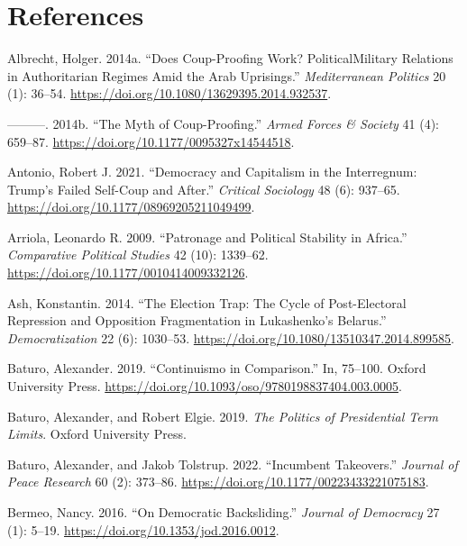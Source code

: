 \documentclass[
  12pt,
]{report}
\newlength{\cslhangindent}
\newenvironment{CSLReferences}[2] %
 {\begin{list}{}{%
  \setlength{\itemindent}{0pt}
  \setlength{\leftmargin}{0pt}
  \setlength{\parsep}{0pt}
  \ifodd #1
   \setlength{\leftmargin}{\cslhangindent}
   \setlength{\itemindent}{-1\cslhangindent}
  \fi
  \setlength{\itemsep}{#2\baselineskip}}}
 {\end{list}}
\begin{document}
\chapter*{References}\label{references}

\label{refs}
\begin{CSLReferences}{1}{0}
Albrecht, Holger. 2014a. {``Does Coup-Proofing Work?
Political{\textendash}Military Relations in Authoritarian Regimes Amid
the Arab Uprisings.''} \emph{Mediterranean Politics} 20 (1): 36--54.
\url{https://doi.org/10.1080/13629395.2014.932537}.

---------. 2014b. {``The Myth of Coup-Proofing.''} \emph{Armed Forces \&
Society} 41 (4): 659--87.
\url{https://doi.org/10.1177/0095327x14544518}.

Antonio, Robert J. 2021. {``Democracy and Capitalism in the Interregnum:
Trump{'}s Failed Self-Coup and After.''} \emph{Critical Sociology} 48
(6): 937--65. \url{https://doi.org/10.1177/08969205211049499}.

Arriola, Leonardo R. 2009. {``Patronage and Political Stability in
Africa.''} \emph{Comparative Political Studies} 42 (10): 1339--62.
\url{https://doi.org/10.1177/0010414009332126}.

Ash, Konstantin. 2014. {``The Election Trap: The Cycle of Post-Electoral
Repression and Opposition Fragmentation in Lukashenko's Belarus.''}
\emph{Democratization} 22 (6): 1030--53.
\url{https://doi.org/10.1080/13510347.2014.899585}.

Baturo, Alexander. 2019. {``Continuismo in Comparison.''} In, 75--100.
Oxford University Press.
\url{https://doi.org/10.1093/oso/9780198837404.003.0005}.

Baturo, Alexander, and Robert Elgie. 2019. \emph{The Politics of
Presidential Term Limits}. Oxford University Press.

Baturo, Alexander, and Jakob Tolstrup. 2022. {``Incumbent Takeovers.''}
\emph{Journal of Peace Research} 60 (2): 373--86.
\url{https://doi.org/10.1177/00223433221075183}.

Bermeo, Nancy. 2016. {``On Democratic Backsliding.''} \emph{Journal of
Democracy} 27 (1): 5--19. \url{https://doi.org/10.1353/jod.2016.0012}.


\end{CSLReferences}
\end{document}
